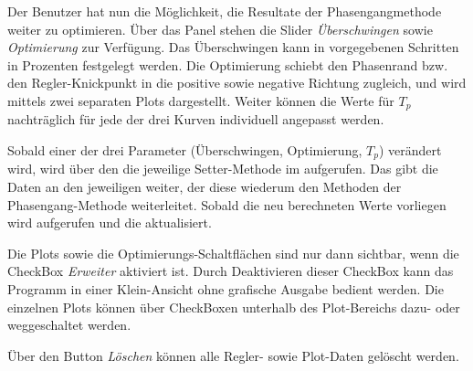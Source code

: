Der Benutzer  hat nun die  M\"oglichkeit, die Resultate  der Phasengangmethode
weiter  zu  optimieren. \"Uber  das   Panel    stehen  die
Slider  \emph{\"Uberschwingen} sowie  \emph{Optimierung} zur  Verf\"ugung. Das
\"Uberschwingen  kann  in  vorgegebenen   Schritten  in  Prozenten  festgelegt
werden. Die Optimierung  schiebt den Phasenrand bzw.  den Regler-Knickpunkt in
die positive sowie negative Richtung zugleich, und wird mittels zwei separaten
Plots dargestellt. Weiter k\"onnen die  Werte f\"ur $T_p$ nachtr\"aglich f\"ur
jede der drei Kurven individuell angepasst werden.

Sobald  einer   der  drei  Parameter  (\"Uberschwingen,   Optimierung,  $T_p$)
ver\"andert  wird,   wird  \"uber   den     die  jeweilige
Setter-Methode im  aufgerufen. Das   gibt die Daten an
den jeweiligen   weiter, der diese wiederum  den Methoden der
Phasengang-Methode  weiterleitet. Sobald die  neu berechneten  Werte vorliegen
wird  aufgerufen und die  aktualisiert.

Die  Plots  sowie die  Optimierungs-Schaltfl\"achen  sind  nur dann  sichtbar,
wenn  die CheckBox  \emph{Erweiter} aktiviert  ist. Durch Deaktivieren  dieser
CheckBox  kann das  Programm  in einer  Klein-Ansicht  ohne grafische  Ausgabe
bedient werden. Die  einzelnen Plots k\"onnen \"uber  CheckBoxen unterhalb des
Plot-Bereichs dazu- oder weggeschaltet werden.

\"Uber  den Button  \emph{L\"oschen}  k\"onnen alle  Regler- sowie  Plot-Daten
gel\"oscht werden.
